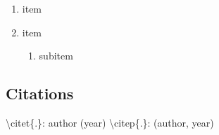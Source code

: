 \documentclass[a4paper, 11pt]{article}
\begin{document}
\begin{enumerate}
	\item item
	\item item
	\begin{enumerate}
		\item subitem
	\end{enumerate}
\end{enumerate}

\subsection{Citations}
\textbackslash citet\{.\}: author (year)
\textbackslash citep\{.\}: (author, year)


\end{document}
